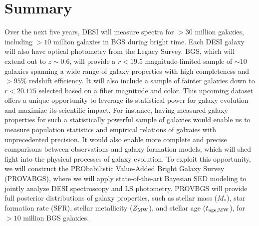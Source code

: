 \section{Summary}
Over the next five years, DESI will measure spectra for ${>}30$ million
galaxies, including ${>}10$ million galaxies in BGS during bright time.
Each DESI galaxy will also have optical photometry from the Legacy Survey. 
BGS, which will extend out to $z\sim0.6$, will provide a $r < 19.5$
magnitude-limited sample of ${\sim}10$ galaxies spanning a wide range of galaxy
properties with high completeness and ${>}95\%$ redshift efficiency. 
It will also include a sample of fainter galaxies down to $r < 20.175$ selected
based on a fiber magnitude and color. 
This upcoming dataset offers a unique opportunity to leverage its statistical
power for galaxy evolution and maximize its scientific impact. 
For instance, having measured galaxy properties for such a statistically
powerful sample of galaxies would enable us to measure population statistics
and empirical relations of galxaies with unprecedented precision. 
It would also enable more complete and precise comparisons between observations
and galaxy formation models, which will shed light into the physical processes
of galaxy evolution.
To exploit this opportunity, we will construct the PRObabilistic Value-Added
Bright Galaxy Survey (PROVABGS), where we will apply state-of-the-art Bayesian
SED modeling to jointly analyze DESI spectroscopy and LS photometry. 
PROVBGS will provide full posterior distributions of galaxy properties, such as
stellar mass ($M_*$), star formation rate (SFR), stellar metallicity 
($Z_{\rm MW}$), and stellar age ($t_{\rm age, MW}$), for ${>}10$ million BGS galaxies.

